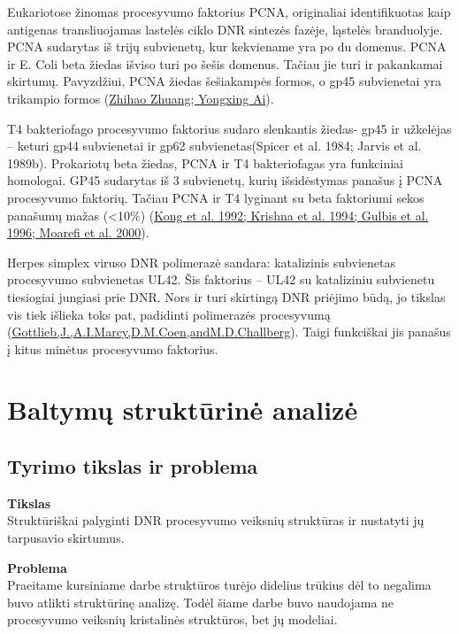 \documentclass[a4paper,12pt]{article}
\begin{document}
\qquad Eukariotose žinomas procesyvumo faktorius PCNA, originaliai identifikuotas kaip antigenas transliuojamas lastelės ciklo DNR sintezės fazėje, ląstelės branduolyje. PCNA sudarytas iš trijų subvienetų, kur kekviename yra po du domenus. PCNA ir E. Coli beta žiedas išviso turi po šešis domenus. Tačiau jie turi ir pakankamai skirtumų. Pavyzdžiui, PCNA žiedas šešiakampės formos,  o gp45 subvienetai yra trikampio formos (\hyperlink{Zhihao}{Zhihao Zhuang; Yongxing Ai}).

\qquad T4 bakteriofago procesyvumo faktorius sudaro slenkantis žiedas- gp45 ir užkelėjas – keturi gp44 subvienetai ir gp62 subvienetas(Spicer et al. 1984; Jarvis et al. 1989b). Prokariotų beta žiedas, PCNA ir T4 bakteriofagas yra funkciniai homologai. GP45 sudarytas iš 3 subvienetų, kurių išsidėstymas panašus į PCNA procesyvumo faktorių. Tačiau PCNA ir T4 lyginant su beta faktoriumi sekos  panašumų mažas (<10\%) (\hyperlink{Kong}{Kong et al. 1992; Krishna et al. 1994; Gulbis et al. 1996; Moarefi et al. 2000}). 

\qquad Herpes simplex viruso DNR polimerazė sandara: katalizinis subvienetas procesyvumo subvienetas UL42. Šis faktorius – UL42 su kataliziniu subvienetu tiesiogiai jungiasi prie DNR. Nors ir turi skirtingą DNR priėjimo būdą, jo tikslas vis tiek išlieka toks pat, padidinti polimerazės procesyvumą (\hyperlink{Gottlieb}{Gottlieb,J.,A.I.Marcy,D.M.Coen,andM.D.Challberg}). Taigi funkciškai jis panašus į kitus minėtus procesyvumo faktorius.


\clearpage 

\section{Baltymų struktūrinė analizė}

\subsection{Tyrimo tikslas ir problema}

\textbf{Tikslas}\\
\qquad Struktūriškai palyginti DNR procesyvumo veiksnių struktūras ir nustatyti jų tarpusavio skirtumus.


\textbf{Problema}\\
\qquad Praeitame kursiniame darbe struktūros turėjo didelius trūkius dėl to negalima buvo atlikti struktūrinę analizę. Todėl šiame darbe buvo naudojama ne procesyvumo veiksnių kristalinės struktūros, bet jų modeliai.
\end{document}

